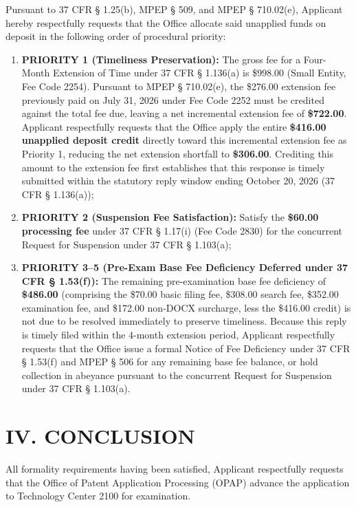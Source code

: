 \documentclass[11pt,letterpaper]{article}
\begin{document}
Pursuant to 37 CFR \S{} 1.25(b), MPEP \S{} 509, and MPEP \S{} 710.02(e), Applicant hereby respectfully requests that the Office allocate said unapplied funds on deposit in the following order of procedural priority:
\begin{enumerate}[leftmargin=*]
    \item \textbf{PRIORITY 1 (Timeliness Preservation):} The gross fee for a Four-Month Extension of Time under 37 CFR \S{} 1.136(a) is \$998.00 (Small Entity, Fee Code 2254). Pursuant to MPEP \S{} 710.02(e), the \$276.00 extension fee previously paid on July 31, 2026 under Fee Code 2252 must be credited against the total fee due, leaving a net incremental extension fee of \textbf{\$722.00}. Applicant respectfully requests that the Office apply the entire \textbf{\$416.00 unapplied deposit credit} directly toward this incremental extension fee as Priority 1, reducing the net extension shortfall to \textbf{\$306.00}. Crediting this amount to the extension fee first establishes that this response is timely submitted within the statutory reply window ending October 20, 2026 (37 CFR \S{} 1.136(a));
    \item \textbf{PRIORITY 2 (Suspension Fee Satisfaction):} Satisfy the \textbf{\$60.00 processing fee} under 37 CFR \S{} 1.17(i) (Fee Code 2830) for the concurrent Request for Suspension under 37 CFR \S{} 1.103(a);
    \item \textbf{PRIORITY 3--5 (Pre-Exam Base Fee Deficiency Deferred under 37 CFR \S{} 1.53(f)):} The remaining pre-examination base fee deficiency of \textbf{\$486.00} (comprising the \$70.00 basic filing fee, \$308.00 search fee, \$352.00 examination fee, and \$172.00 non-DOCX surcharge, less the \$416.00 credit) is not due to be resolved immediately to preserve timeliness. Because this reply is timely filed within the 4-month extension period, Applicant respectfully requests that the Office issue a formal Notice of Fee Deficiency under 37 CFR \S{} 1.53(f) and MPEP \S{} 506 for any remaining base fee balance, or hold collection in abeyance pursuant to the concurrent Request for Suspension under 37 CFR \S{} 1.103(a).
\end{enumerate}

\section*{IV. CONCLUSION}

All formality requirements having been satisfied, Applicant respectfully requests that the Office of Patent Application Processing (OPAP) advance the application to Technology Center 2100 for examination.
\end{document}
